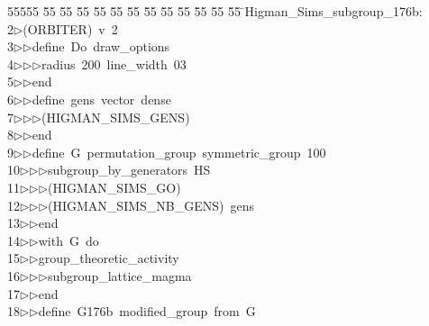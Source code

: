 %
%
\begin{tabbing}
55555 \= 55 \= 55 \= 55 \= 55 \= 55 \= 55 \= 55 \= 55 \= 55 \= 55 \= 55 \= 55 \= \>Higman\_Sims\_subgroup\_176b:\\[0pt]
2\>$\triangleright$\>(ORBITER)\ v\ 2\ \\[0pt]
3\>$\triangleright$\>$\triangleright$\>define\ Do\ draw\_options\ \\[0pt]
4\>$\triangleright$\>$\triangleright$\>$\triangleright$\>radius\ 200\ line\_width\ 03\ \\[0pt]
5\>$\triangleright$\>$\triangleright$\>end\ \\[0pt]
6\>$\triangleright$\>$\triangleright$\>define\ gens\ vector\ dense\ \\[0pt]
7\>$\triangleright$\>$\triangleright$\>$\triangleright$\>(HIGMAN\_SIMS\_GENS)\ \\[0pt]
8\>$\triangleright$\>$\triangleright$\>end\ \\[0pt]
9\>$\triangleright$\>$\triangleright$\>define\ G\ permutation\_group\ symmetric\_group\ 100\ \\[0pt]
10\>$\triangleright$\>$\triangleright$\>$\triangleright$\>subgroup\_by\_generators\ HS\ \\[0pt]
11\>$\triangleright$\>$\triangleright$\>$\triangleright$\>(HIGMAN\_SIMS\_GO)\ \\[0pt]
12\>$\triangleright$\>$\triangleright$\>$\triangleright$\>(HIGMAN\_SIMS\_NB\_GENS)\ gens\ \\[0pt]
13\>$\triangleright$\>$\triangleright$\>end\ \\[0pt]
14\>$\triangleright$\>$\triangleright$\>with\ G\ do\ \\[0pt]
15\>$\triangleright$\>$\triangleright$\>group\_theoretic\_activity\ \\[0pt]
16\>$\triangleright$\>$\triangleright$\>$\triangleright$\>subgroup\_lattice\_magma\ \\[0pt]
17\>$\triangleright$\>$\triangleright$\>end\ \\[0pt]
18\>$\triangleright$\>$\triangleright$\>define\ G176b\ modified\_group\ from\ G\ \\[0pt]

\end{tabbing}
